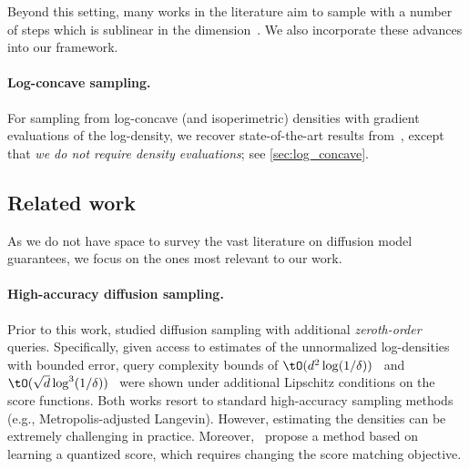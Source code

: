 \documentclass{article} %
\let\oldparagraph\paragraph
\renewcommand{\paragraph}[1]{\oldparagraph{#1.}}
\begin{document}
Beyond this setting, many works in the literature aim to sample with a number of steps which is sublinear in the dimension~\citep{Chen+23FlowODE, jiao2024instance,jiao2025optimal, zhang2025sublinear}.
We also incorporate these advances into our framework. 


\paragraph{Log-concave sampling}
For sampling from log-concave (and isoperimetric) densities with gradient evaluations of the log-density, we recover state-of-the-art results from~\citet{FanYuaChe23ImprovedProx}, except that \emph{we do not require density evaluations}; see \cref{sec:log_concave}.

\subsection{Related work}

As we do not have space to survey the vast literature on diffusion model guarantees, we focus on the ones most relevant to our work.

\paragraph{High-accuracy diffusion sampling}
Prior to this work, \citet{huang2024reverse,wainwright2025score} studied diffusion sampling with additional \emph{zeroth-order} queries. Specifically, given access to estimates of the unnormalized log-densities with bounded error, query complexity bounds of $\tO(d^2\log(1/\delta))$~\citep{huang2024reverse} and $\tO(\sqrt{d}\log^3(1/\delta))$~\citep{wainwright2025score} were shown under additional Lipschitz conditions on the score functions. Both works resort to standard high-accuracy sampling methods (e.g., Metropolis-adjusted Langevin). However, estimating the densities can be extremely challenging in practice. Moreover,~\citet{Hua+25QuantizedDiffusion} propose a method based on learning a quantized score, which requires changing the score matching objective.
\end{document}
